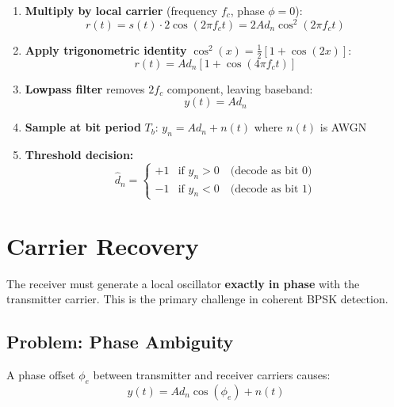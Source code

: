\begin{enumerate}
\item \textbf{Multiply by local carrier} (frequency $f_c$, phase $\phi = 0$):
\begin{equation}
r(t) = s(t) \cdot 2\cos(2\pi f_c t) = 2A d_n \cos^2(2\pi f_c t)
\end{equation}

\item \textbf{Apply trigonometric identity} $\cos^2(x) = \frac{1}{2}[1 + \cos(2x)]$:
\begin{equation}
r(t) = A d_n [1 + \cos(4\pi f_c t)]
\end{equation}

\item \textbf{Lowpass filter} removes $2f_c$ component, leaving baseband:
\begin{equation}
y(t) = A d_n
\end{equation}

\item \textbf{Sample at bit period} $T_b$: $y_n = A d_n + n(t)$ where $n(t)$ is AWGN

\item \textbf{Threshold decision:}
\begin{equation}
\hat{d}_n = \begin{cases}
+1 & \text{if } y_n > 0 \quad \text{(decode as bit 0)} \\
-1 & \text{if } y_n < 0 \quad \text{(decode as bit 1)}
\end{cases}
\end{equation}
\end{enumerate}

\section{Carrier Recovery}

The receiver must generate a local oscillator \textbf{exactly in phase} with the transmitter carrier. This is the primary challenge in coherent BPSK detection.

\subsection{Problem: Phase Ambiguity}

A phase offset $\phi_e$ between transmitter and receiver carriers causes:
\begin{equation}
y(t) = A d_n \cos(\phi_e) + n(t)
\end{equation}

